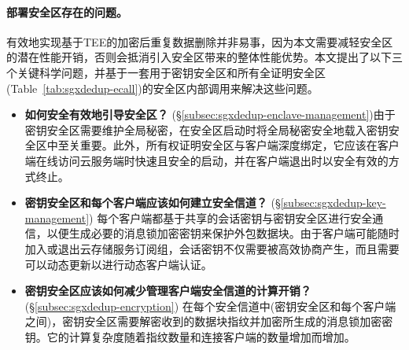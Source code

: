 \paragraph*{部署安全区存在的问题。}有效地​​实现基于TEE的加密后重复数据删除并非易事，因为本文需要减轻安全区的潜在性能开销，否则会抵消引入安全区带来的整体性能优势。本文提出了以下三个关键科学问题，并基于一套用于密钥安全区和所有全证明安全区(Table~\ref{tab:sgxdedup-ecall})的安全区内部调用来解决这些问题。

\begin{itemize}
    \item \textbf{如何安全有效地引导安全区？} (\S\ref{subsec:sgxdedup-enclave-management})由于密钥安全区需要维护全局秘密，在安全区启动时将全局秘密安全地载入密钥安全区中至关重要。此外，所有权证明安全区与客户端深度绑定，它应该在客户端在线访问云服务端时快速且安全的启动，并在客户端退出时以安全有效的方式终止。
    \item \textbf{密钥安全区和每个客户端应该如何建立安全信道？} (\S\ref{subsec:sgxdedup-key-management})
          每个客户端都基于共享的会话密钥与密钥安全区进行安全通信，以便生成必要的消息锁加密密钥来保护外包数据块。由于客户端可能随时加入或退出云存储服务订阅组，会话密钥不仅需要被高效协商产生，而且需要可以动态更新以进行动态客户端认证。
    \item \textbf{密钥安全区应该如何减少管理客户端安全信道的计算开销？} (\S\ref{subsec:sgxdedup-encryption})
          在每个安全信道中(密钥安全区和每个客户端之间)，密钥安全区需要解密收到的数据块指纹并加密所生成的消息锁加密密钥。它的计算复杂度随着指纹数量和连接客户端的数量增加而增加。
\end{itemize}
